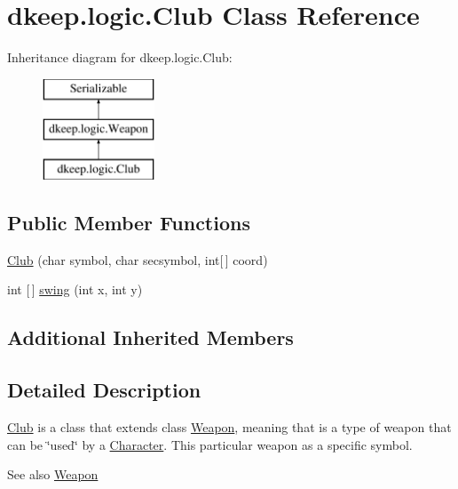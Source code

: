 \hypertarget{classdkeep_1_1logic_1_1_club}{}\section{dkeep.\+logic.\+Club Class Reference}
\label{classdkeep_1_1logic_1_1_club}
Inheritance diagram for dkeep.\+logic.\+Club\+:\begin{figure}[H]
\begin{center}
\leavevmode
\includegraphics[height=3.000000cm]{classdkeep_1_1logic_1_1_club}
\end{center}
\end{figure}
\subsection*{Public Member Functions}
\begin{DoxyCompactItemize}
\item 
\hyperlink{classdkeep_1_1logic_1_1_club_a214c1629b02c86c58ee5cc6c73e26e2c}{Club} (char symbol, char secsymbol, int\mbox{[}$\,$\mbox{]} coord)
\item 
int \mbox{[}$\,$\mbox{]} \hyperlink{classdkeep_1_1logic_1_1_club_a11ee654cc6aea04eb87aad2f4e8b3edb}{swing} (int x, int y)
\end{DoxyCompactItemize}
\subsection*{Additional Inherited Members}


\subsection{Detailed Description}
\hyperlink{classdkeep_1_1logic_1_1_club}{Club} is a class that extends class \hyperlink{classdkeep_1_1logic_1_1_weapon}{Weapon}, meaning that is a type of weapon that can be \char`\"{}used\char`\"{} by a \hyperlink{classdkeep_1_1logic_1_1_character}{Character}. This particular weapon as a specific symbol. \begin{DoxySeeAlso}{See also}
\hyperlink{classdkeep_1_1logic_1_1_weapon}{Weapon} 
\end{DoxySeeAlso}


